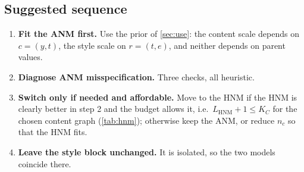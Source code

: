 \subsection{Suggested sequence}
\begin{enumerate}[label=\arabic*.,leftmargin=2em]
\item \textbf{Fit the ANM first.} Use the prior of \cref{sec:use}: the content scale depends on $c=(y,t)$, the
      style scale on $r=(t,e)$, and neither depends on parent values.
\item \textbf{Diagnose ANM misspecification.} Three checks, all heuristic.
\item \textbf{Switch only if needed and affordable.} Move to the HNM if the HNM is clearly better in step 2 and
      the budget allows it, i.e.\ $L_{\mathrm{HNM}}+1\le K_C$ for the chosen content graph
      (\cref{tab:hnm}); otherwise keep the ANM, or reduce $n_c$ so that the HNM fits.
\item \textbf{Leave the style block unchanged.} It is isolated, so the two models coincide there.
\end{enumerate}

